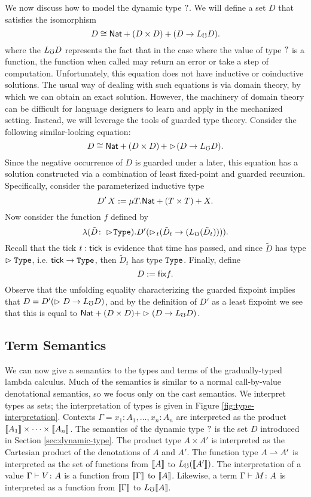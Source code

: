 We now discuss how to model the dynamic type $?$.
We will define a set $D$ that satisfies the isomorphism
%
\[ D \cong \mathsf{Nat} + (D \times D) + (D \to L_\mho D). \]
%
where the $L_\mho D$ represents the fact that in the case where the value of type
$?$ is a function, the function when called may return an error or take a
step of computation. Unfortunately, this equation does not have inductive or
coinductive solutions. The usual way of dealing with such equations is via
domain theory, by which we can obtain an exact solution. However, the machinery
of domain theory can be difficult for language designers to learn and apply in
the mechanized setting. Instead, we will leverage the tools of guarded type
theory. Consider the following similar-looking equation:
%
\[ D \cong \mathsf{Nat} + (D \times D)\, + \vartriangleright \hspace{-0.2em} (D \to L_\mho D). \]
%
Since the negative occurrence of $D$ is guarded under a later, this equation has
a solution constructed via a combination of least fixed-point and guarded
recursion. Specifically, consider the parameterized inductive type
%
\[ D'\, X := \mu T. \mathsf{Nat} + (T \times T) + X. \]
%
Now consider the function $f$ defined by
%
\[ \lambda (\tilde{D} \colon \vartriangleright \hspace{-0.2em} \texttt{Type}) . D' (\vartriangleright \hspace{-0.2em}_t (\tilde{D}_t \to (L_\mho (\tilde{D}_t)))). \]
%
Recall that the tick $t : \mathsf{tick}$ is evidence that time has passed, and since
$\tilde{D}$ has type $\vartriangleright \texttt{Type}$, i.e. $\mathsf{tick} \to \texttt{Type}$, then $\tilde{D}_t$
has type $\texttt{Type}$.
%
Finally, define 
\[ D := \mathsf{fix} f. \]
%
Observe that the unfolding equality characterizing the guarded fixpoint implies
that $D = D' (\vartriangleright D \to L_\mho D)$, and by the definition of $D'$ as a least
fixpoint we see that this is equal to $\mathsf{Nat} + (D \times D) + \vartriangleright (D \to L_\mho
D)$.


\subsection{Term Semantics}\label{sec:term-interpretation}

We can now give a semantics to the types and terms of the gradually-typed lambda
calculus. 
%
Much of the semantics is similar to a normal call-by-value denotational
semantics, so we focus only on the cast semantics. We interpret types as sets;
the interpretation of types is given in Figure \ref{fig:type-interpretation}.
Contexts $\Gamma = x_1 \colon A_1, \dots, x_n \colon A_n$ are interpreted as the
product $\llbracket {A_1} \rrbracket \times \cdots \times \llbracket {A_n} \rrbracket$. The semantics of the dynamic
type $?$ is the set $D$ introduced in Section \ref{sec:dynamic-type}. The
product type $A \times A'$ is interpreted as the Cartesian product of the
denotations of $A$ and $A'$. The function type $A \rightharpoonup A'$ is interpreted as the
set of functions from $\llbracket {A} \rrbracket$ to $L_\mho (\llbracket {A'} \rrbracket)$.
%
The interpretation of a value ${\Gamma} \vdash {V} \colon {A}$ is a function from
$\llbracket {\Gamma} \rrbracket$ to $\llbracket {A} \rrbracket$. Likewise, a term ${\Gamma} \vdash {M} \colon {{A}}$ is
interpreted as a function from $\llbracket {\Gamma} \rrbracket$ to $L_\mho \llbracket {A} \rrbracket$.

